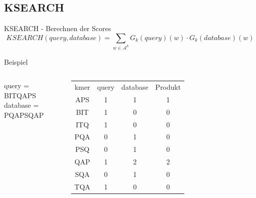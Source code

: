 \documentclass[xcolor=dvipsnames, aspectratio=1610]{beamer}
\begin{document}

\subsection{KSEARCH}

\begin{frame}{KSEARCH - Berechnen der Scores}
  \begin{equation*}
    KSEARCH(query,database) = \sum_{w \in \mathcal A^k} G_k(query)(w) \cdot G_k(database)(w)
  \end{equation*}  
  \begin{block}{Beispiel}
    \begin{columns}
    query = BITQAPS\\
    database = PQAPSQAP\\  
    \scriptsize\begin{tabular}{cccc}
    kmer & query & database & Produkt\\
    APS & 1 & 1 & 1\\
    BIT & 1 & 0 & 0\\
    ITQ & 1 & 0 & 0 \\
    PQA & 0 & 1 & 0\\
    PSQ & 0 & 1 & 0\\
    QAP & 1 & 2 & 2\\
    SQA & 0 & 1 & 0\\
    TQA & 1 & 0 & 0\\    
    \end{tabular}
    \normalsize
    \end{columns}
  \end{block}
\end{frame}
\end{document}
